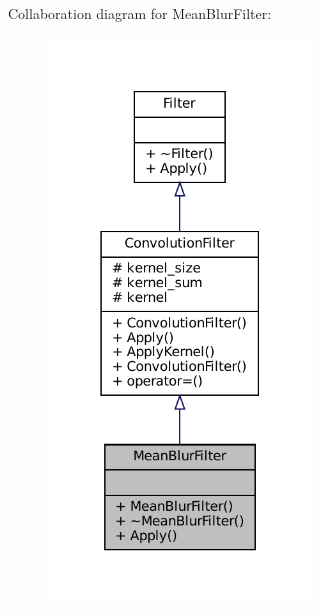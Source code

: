 Collaboration diagram for Mean\+Blur\+Filter\+:\nopagebreak
\begin{figure}[H]
\begin{center}
\leavevmode
\includegraphics[width=198pt]{classMeanBlurFilter__coll__graph}
\end{center}
\end{figure}
